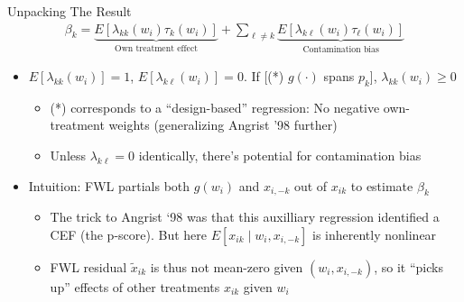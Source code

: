 \documentclass[11pt,english]{beamer}
\begin{document}
\begin{frame}{Unpacking The Result}
\vspace{-0.7cm}
\begin{align*}
\beta_k=\underbrace{E[\lambda_{kk}(w_i)\tau_k(w_i)]}_{\text{Own treatment effect}}+\sum_{\ell\neq k}\underbrace{E[\lambda_{k\ell}(w_i)\tau_\ell(w_i)]}_{\text{Contamination bias}}
\end{align*}
\begin{itemize}
\item $E[\lambda_{kk}(w_i)]=1$, $E[\lambda_{k\ell}(w_i)]=0$. If [(*) $g(\cdot)$ spans $p_k$], $\lambda_{kk}(w_i)\ge 0$  \smallskip\pause{}
\begin{itemize}
\item (*) corresponds to a ``design-based'' regression: No negative own-treatment weights (generalizing Angrist '98 further)\smallskip\pause{}
\item Unless $\lambda_{k\ell}=0$ identically, there's potential for contamination bias 
\end{itemize}\bigskip\pause{}

\item Intuition: FWL partials both $g(w_i)$ and $x_{i,- k}$ out of $x_{ik}$ to estimate $\beta_k$ \smallskip
\vspace{-0.4cm}
\begin{itemize}
\item The trick to Angrist `98 was that this auxilliary regression identified a CEF (the p-score). But here $E[x_{ik}\mid w_i,x_{i,-k}]$ is inherently nonlinear\smallskip\pause{}
\item FWL residual $\tilde{x}_{ik}$ is thus not mean-zero given $(w_i,x_{i,-k})$, so it ``picks up'' effects of other treatments $x_{ik}$ given $w_i$
\end{itemize}
\end{itemize}
\end{frame}
\end{document}
